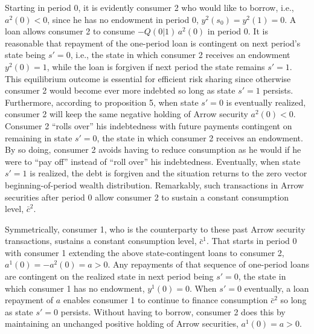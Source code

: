 Starting in period 0, it is evidently consumer 2
who would like to borrow, i.e.,  $a^2(0)<0$, since he 
has no endowment in period 0, $y^2(s_0)=y^2(1)=0$.
A loan allows consumer 2 to consume
$-Q(0 | 1)\, a^2(0)$ in period 0. It is reasonable 
that  repayment of the one-period loan is
contingent on next period's state being
$s'=0$, i.e., the state in which consumer 2 
receives an endowment $y^2(0)=1$, while the
loan is forgiven if next period the  state remains  $s'=1$. This equilibrium outcome is 
essential for  efficient risk sharing since
otherwise consumer 2 would become ever more
indebted so long as state $s'=1$ persists.
Furthermore, according to proposition 5, 
when state $s'=0$ is eventually realized, 
consumer 2 will keep the same negative 
holding of Arrow security $a^2(0)<0$.
Consumer 2  ``rolls over''
his indebtedness with future payments
contingent on remaining in state $s'=0$, the state
in which consumer 2 receives an endowment. By 
so doing, consumer 2 avoids having to reduce
consumption as he would  if he were  to ``pay off'' instead of  ``roll over'' 
his indebtedness. Eventually, when state $s'=1$ 
is realized, the debt is forgiven and the 
situation returns  to the zero vector beginning-of-period 
wealth distribution. Remarkably, such 
transactions in Arrow securities after period 0 
allow consumer 2 to sustain a constant 
consumption level, $\bar c^2$.

Symmetrically,  consumer 1, who is the counterparty to these past Arrow
security transactions,  sustains  a constant consumption level,
$\bar c^1$. That starts in period 0 with
consumer 1 extending the above state-contingent 
loans to consumer 2, $a^1(0)=-a^2(0)=a >0$.
Any repayments of  that sequence of 
one-period loans are contingent on the
realized state in next period being $s'=0$, the
state in which consumer 1 has no endowment,
$y^1(0)=0$. When $s' = 0$ eventually, 
a loan repayment of $a$ enables consumer 1 
to continue to finance consumption 
$\bar c^2$ so long as state $s'=0$ persists. 
Without having to borrow, consumer 2 does this 
by maintaining an unchanged positive holding of 
Arrow securities, $a^1(0)=a>0$. 

